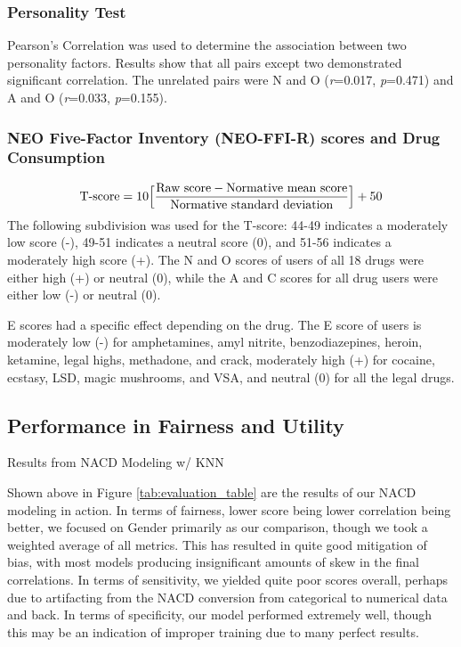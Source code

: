 \documentclass{article}
\begin{document}
    \subsubsection{Personality Test}
    Pearson's Correlation was used to determine the association between two personality factors. Results show that all pairs except two demonstrated significant correlation. The unrelated pairs were N and O (\emph{r}=0.017, \emph{p}=0.471) and A and O (\emph{r}=0.033, \emph{p}=0.155).
    
    \subsubsection{NEO Five-Factor Inventory (NEO-FFI-R) scores and Drug Consumption}
    \begin{equation}
        \text{T-score} = 10 \Bigl[\frac{\text{Raw score} - \text{Normative mean score}}{\text{Normative standard deviation}}\Bigr] + 50
    \end{equation}
    The following subdivision was used for the T-score: 44-49 indicates a moderately low score (-), 49-51 indicates a neutral score (0), and 51-56 indicates a moderately high score (+). The N and O scores of users of all 18 drugs were either high (+) or neutral (0), while the A and C scores for all drug users were either low (-) or neutral (0). 
    
    E scores had a specific effect depending on the drug. The E score of users is moderately low (-) for amphetamines, amyl nitrite, benzodiazepines, heroin, ketamine, legal highs, methadone, and crack, moderately high (+) for cocaine, ecstasy, LSD, magic mushrooms, and VSA, and neutral (0) for all the legal drugs.

    \subsection{Performance in Fairness and Utility} 
    \begin{table}
        \centering
        \caption{Results from NACD Modeling w/ KNN}
        \label{tab:evaluation_table}
    \end{table}

    Shown above in Figure \ref{tab:evaluation_table} are the results of our NACD modeling in action. In terms of fairness, lower score being lower correlation being better, we focused on Gender primarily as our comparison, though we took a weighted average of all metrics. This has resulted in quite good mitigation of bias, with most models producing insignificant amounts of skew in the final correlations. In terms of sensitivity, we yielded quite poor scores overall, perhaps due to artifacting from the NACD conversion from categorical to numerical data and back. In terms of specificity, our model performed extremely well, though this may be an indication of improper training due to many perfect results.
\end{document}
